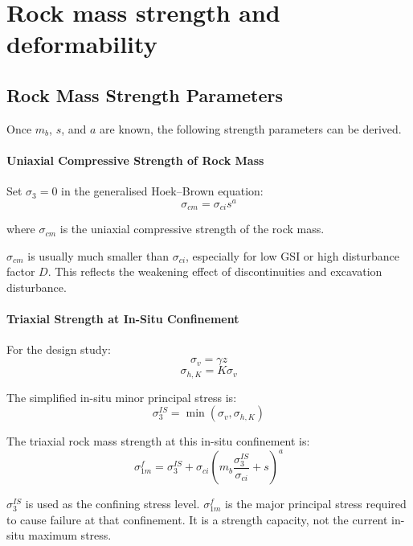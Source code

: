 \section{Rock mass strength and deformability}
\label{sec:rock-mass-strength-and-deformability}

\subsection{Rock Mass Strength Parameters}

Once \(m_b\), \(s\), and \(a\) are known, the following strength parameters can be derived.

\paragraph{Uniaxial Compressive Strength of Rock Mass}

Set \(\sigma_3=0\) in the generalised Hoek--Brown equation:
\[
\sigma_{cm}
=
\sigma_{ci}s^a
\]

where \(\sigma_{cm}\) is the uniaxial compressive strength of the rock mass.

\begin{notebox}[Interpretation]
\(\sigma_{cm}\) is usually much smaller than \(\sigma_{ci}\), especially for low GSI or high
disturbance factor \(D\). This reflects the weakening effect of discontinuities and
excavation disturbance.
\end{notebox}

\paragraph{Triaxial Strength at In-Situ Confinement}

For the design study:
\[
\sigma_v = \gamma z
\]
\[
\sigma_{h,K}=K\sigma_v
\]

The simplified in-situ minor principal stress is:
\[
\sigma_3^{IS}=\min(\sigma_v,\sigma_{h,K})
\]

The triaxial rock mass strength at this in-situ confinement is:
\[
\sigma_{1m}^f =
\sigma_3^{IS}
+
\sigma_{ci}
\left(
m_b\frac{\sigma_3^{IS}}{\sigma_{ci}} + s
\right)^a
\]

\begin{warnbox}
\(\sigma_3^{IS}\) is used as the confining stress level. 
\(\sigma_{1m}^f\) is the major principal stress required to cause failure at that confinement.
It is a strength capacity, not the current in-situ maximum stress.
\end{warnbox}

